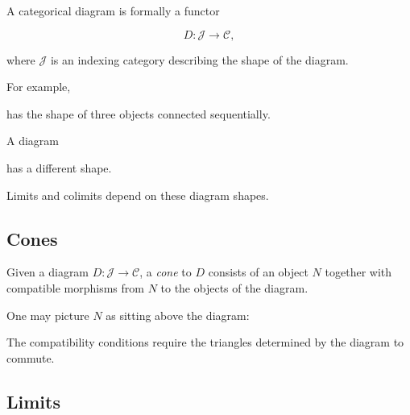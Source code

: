 A categorical diagram is formally a functor

\[ D:\mathcal J\to\mathcal C, \]

where \(\mathcal J\) is an indexing category describing the shape of the
diagram.

For example,

\begin{center}
\end{center}

has the shape of three objects connected sequentially.

A diagram

\begin{center}
\end{center}

has a different shape.

Limits and colimits depend on these diagram shapes.

\subsection{Cones}
\label{subsec:category-cones}

Given a diagram \(D:\mathcal J\to\mathcal C\), a \emph{cone} to \(D\)
consists of an object \(N\) together with compatible morphisms from \(N\)
to the objects of the diagram.

One may picture \(N\) as sitting above the diagram:

\begin{center}
\end{center}

The compatibility conditions require the triangles determined by the
diagram to commute.

\subsection{Limits}
\label{subsec:category-limits}

